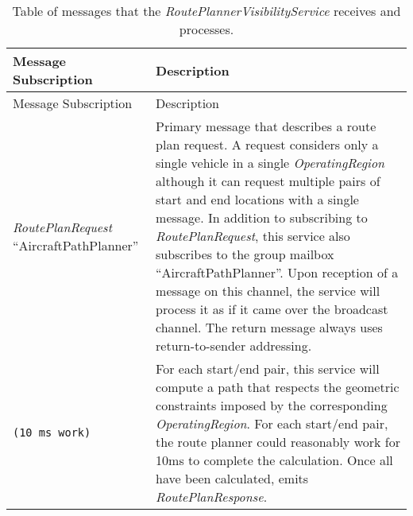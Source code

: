 \begin{longtable}[c]{@{}ll@{}}
\caption{Table of messages that the \emph{RoutePlannerVisibilityService}
receives and processes.}\tabularnewline
\toprule
\begin{minipage}[b]{0.29\columnwidth}\raggedright\strut
Message Subscription
\strut\end{minipage} &
\begin{minipage}[b]{0.65\columnwidth}\raggedright\strut
Description
\strut\end{minipage}\tabularnewline
\midrule
\endfirsthead
\toprule
\begin{minipage}[b]{0.29\columnwidth}\raggedright\strut
Message Subscription
\strut\end{minipage} &
\begin{minipage}[b]{0.65\columnwidth}\raggedright\strut
Description
\strut\end{minipage}\tabularnewline
\midrule
\endhead
\begin{minipage}[t]{0.29\columnwidth}\raggedright\strut
\emph{RoutePlanRequest} ``AircraftPathPlanner''
\strut\end{minipage} &
\begin{minipage}[t]{0.65\columnwidth}\raggedright\strut
Primary message that describes a route plan request. A request considers
only a single vehicle in a single \emph{OperatingRegion} although it can
request multiple pairs of start and end locations with a single message.
In addition to subscribing to \emph{RoutePlanRequest}, this service also
subscribes to the group mailbox ``AircraftPathPlanner''. Upon reception
of a message on this channel, the service will process it as if it came
over the broadcast channel. The return message always uses
return-to-sender addressing.
\strut\end{minipage}\tabularnewline
\begin{minipage}[t]{0.29\columnwidth}\raggedright\strut
\begin{verbatim}
(10 ms work)
\end{verbatim}
\strut\end{minipage} &
\begin{minipage}[t]{0.65\columnwidth}\raggedright\strut
For each start/end pair, this service will compute a path that respects
the geometric constraints imposed by the corresponding
\emph{OperatingRegion}. For each start/end pair, the route planner could
reasonably work for 10ms to complete the calculation. Once all have been
calculated, emits \emph{RoutePlanResponse}.
\strut\end{minipage}\tabularnewline

\end{longtable}
